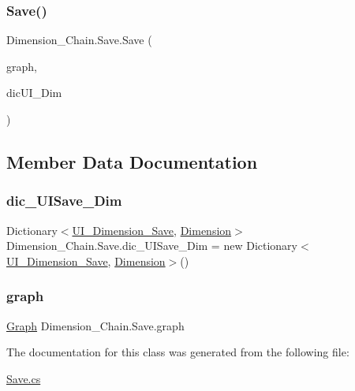 \subsubsection{\texorpdfstring{Save()}{Save()}}
{\footnotesize\ttfamily Dimension\+\_\+\+Chain.\+Save.\+Save (\begin{DoxyParamCaption}\item[{\mbox{\hyperlink{class_dimension___chain_1_1_graph}{Graph}}}]{graph,  }\item[{Dictionary$<$ \mbox{\hyperlink{class_dimension___chain_1_1_u_i___dimension}{U\+I\+\_\+\+Dimension}}, \mbox{\hyperlink{class_dimension___chain_1_1_dimension}{Dimension}} $>$}]{dic\+U\+I\+\_\+\+Dim }\end{DoxyParamCaption})}



\subsection{Member Data Documentation}
\mbox{\label{class_dimension___chain_1_1_save_a89f0c6170a8dc6940853086f8d84ab5f}} 
\subsubsection{\texorpdfstring{dic\+\_\+\+U\+I\+Save\+\_\+\+Dim}{dic\_UISave\_Dim}}
{\footnotesize\ttfamily Dictionary$<$\mbox{\hyperlink{class_dimension___chain_1_1_u_i___dimension___save}{U\+I\+\_\+\+Dimension\+\_\+\+Save}}, \mbox{\hyperlink{class_dimension___chain_1_1_dimension}{Dimension}}$>$ Dimension\+\_\+\+Chain.\+Save.\+dic\+\_\+\+U\+I\+Save\+\_\+\+Dim = new Dictionary$<$\mbox{\hyperlink{class_dimension___chain_1_1_u_i___dimension___save}{U\+I\+\_\+\+Dimension\+\_\+\+Save}}, \mbox{\hyperlink{class_dimension___chain_1_1_dimension}{Dimension}}$>$()}

\mbox{\label{class_dimension___chain_1_1_save_ae83ba48253eae3156de679a361ac853a}} 
\subsubsection{\texorpdfstring{graph}{graph}}
{\footnotesize\ttfamily \mbox{\hyperlink{class_dimension___chain_1_1_graph}{Graph}} Dimension\+\_\+\+Chain.\+Save.\+graph}



The documentation for this class was generated from the following file\+:\begin{DoxyCompactItemize}
\item 
\mbox{\hyperlink{_save_8cs}{Save.\+cs}}\end{DoxyCompactItemize}
